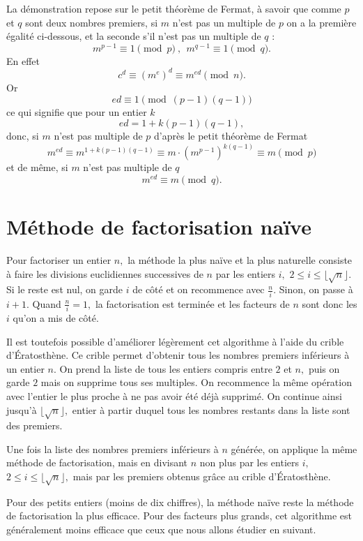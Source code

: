 \documentclass[french, 12pt, titlepage]{article}
\begin{document}
La démonstration repose sur le petit théorème de Fermat, à savoir que comme $p$ et $q$ sont deux nombres premiers, si $m$ n'est pas un multiple de $p$ on a la première égalité ci-dessous, et la seconde s'il n'est pas un multiple de $q$ :
\[ m^{p-1} \equiv 1 \pmod p\ ,\ \ m^{q-1} \equiv 1 \pmod q.\]
En effet
\[ c^d \equiv (m^e)^d \equiv m^{ed} \pmod n.\]
Or
\[ed \equiv 1 \pmod{(p-1)(q-1)}\]
ce qui signifie que pour un entier $k$
\[ed = 1 + k(p-1)(q-1),\]
donc, si $m$ n'est pas multiple de $p$ d'après le petit théorème de Fermat
\[m^{ed} \equiv m^{1+k(p-1)(q-1) }\equiv m\cdot \left(m^{p-1}\right)^{k(q-1)}\equiv m \pmod p\]
et de même, si $m$ n'est pas multiple de $q$
\[m^{ed}\equiv m \pmod q.\]

\section{Méthode de factorisation naïve}

Pour factoriser un entier $n,$ la méthode la plus naïve et la plus naturelle consiste à faire les divisions euclidiennes successives de $n$ par les entiers $i,$ $2 \leq i \leq \lfloor\sqrt{n}\rfloor.$ Si le reste est nul, on garde $i$ de côté et on recommence avec $\frac{n}{i}.$ Sinon, on passe à $i + 1.$ Quand $\frac{n}{i} = 1,$ la factorisation est terminée et les facteurs de $n$ sont donc les $i$ qu'on a mis de côté.

Il est toutefois possible d'améliorer légèrement cet algorithme à l'aide du crible d'{\'E}ratosthène. Ce crible permet d'obtenir tous les nombres premiers inférieurs à un entier $n.$
On prend la liste de tous les entiers compris entre $2$ et $n,$ puis on garde $2$ mais on supprime tous ses multiples. On recommence la même opération avec l'entier le plus proche à ne pas avoir été déjà supprimé.
On continue ainsi jusqu'à $\lfloor\sqrt{n}\rfloor,$ entier à partir duquel tous les nombres restants dans la liste sont des premiers.

Une fois la liste des nombres premiers inférieurs à $n$ générée, on applique la même méthode de factorisation, mais en divisant $n$ non plus par les entiers $i,$ $2 \leq i \leq \lfloor\sqrt{n}\rfloor,$
mais par les premiers obtenus grâce au crible d'{\'E}ratosthène.

Pour des petits entiers (moins de dix chiffres), la méthode naïve reste la méthode de factorisation la plus efficace. Pour des facteurs plus grands, cet algorithme est généralement moins efficace
que ceux que nous allons étudier en suivant.
\end{document}
